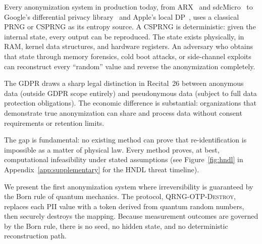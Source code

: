 \documentclass[acmsmall,screen,review,anonymous]{acmart}
\begin{document}
Every anonymization system in production today, from ARX~\cite{prasser2014arx} and sdcMicro~\cite{templ2017sdc} to Google's differential privacy library~\cite{wilson2020dpsql} and Apple's local DP~\cite{apple2017dp}, uses a classical PRNG or CSPRNG as its entropy source. A CSPRNG is deterministic: given the internal state, every output can be reproduced. The state exists physically, in RAM, kernel data structures, and hardware registers. An adversary who obtains that state through memory forensics, cold boot attacks, or side-channel exploits can reconstruct every ``random'' value and reverse the anonymization completely.

The GDPR draws a sharp legal distinction in Recital~26 between anonymous data (outside GDPR scope entirely) and pseudonymous data (subject to full data protection obligations). The economic difference is substantial: organizations that demonstrate true anonymization can share and process data without consent requirements or retention limits.

The gap is fundamental: no existing method can prove that re-identification is impossible as a matter of physical law. Every method proves, at best, computational infeasibility under stated assumptions (see Figure~\ref{fig:hndl} in Appendix~\ref{app:supplementary} for the HNDL threat timeline).

We present the first anonymization system where irreversibility is guaranteed by the Born rule of quantum mechanics. The protocol, \textsc{QRNG-OTP-Destroy}, replaces each PII value with a token derived from quantum random numbers, then securely destroys the mapping. Because measurement outcomes are governed by the Born rule, there is no seed, no hidden state, and no deterministic reconstruction path.
\end{document}
